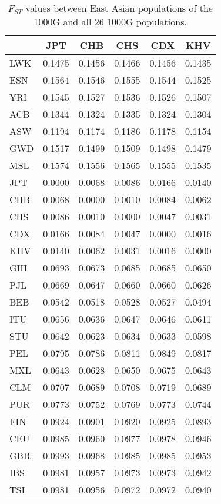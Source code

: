 \begin{table}[ht]
\centering
\caption{$F_{ST}$ values between East Asian populations of the 1000G and all 26 1000G populations.} 
\label{tab:fst-EAS}
\begin{tabular}{|l|c|c|c|c|c|}
  \hline
 & JPT & CHB & CHS & CDX & KHV \\ 
  \hline
LWK & 0.1475 & 0.1456 & 0.1466 & 0.1456 & 0.1435 \\ 
  ESN & 0.1564 & 0.1546 & 0.1555 & 0.1544 & 0.1525 \\ 
  YRI & 0.1545 & 0.1527 & 0.1536 & 0.1526 & 0.1507 \\ 
  ACB & 0.1344 & 0.1324 & 0.1335 & 0.1324 & 0.1304 \\ 
  ASW & 0.1194 & 0.1174 & 0.1186 & 0.1178 & 0.1154 \\ 
  GWD & 0.1517 & 0.1499 & 0.1509 & 0.1498 & 0.1479 \\ 
  MSL & 0.1574 & 0.1556 & 0.1565 & 0.1555 & 0.1535 \\ 
   \hline
JPT & 0.0000 & 0.0068 & 0.0086 & 0.0166 & 0.0140 \\ 
  CHB & 0.0068 & 0.0000 & 0.0010 & 0.0084 & 0.0062 \\ 
  CHS & 0.0086 & 0.0010 & 0.0000 & 0.0047 & 0.0031 \\ 
  CDX & 0.0166 & 0.0084 & 0.0047 & 0.0000 & 0.0016 \\ 
  KHV & 0.0140 & 0.0062 & 0.0031 & 0.0016 & 0.0000 \\ 
   \hline
GIH & 0.0693 & 0.0673 & 0.0685 & 0.0685 & 0.0650 \\ 
  PJL & 0.0669 & 0.0647 & 0.0660 & 0.0660 & 0.0626 \\ 
  BEB & 0.0542 & 0.0518 & 0.0528 & 0.0527 & 0.0494 \\ 
  ITU & 0.0656 & 0.0636 & 0.0647 & 0.0646 & 0.0611 \\ 
  STU & 0.0642 & 0.0623 & 0.0634 & 0.0633 & 0.0598 \\ 
   \hline
PEL & 0.0795 & 0.0786 & 0.0811 & 0.0849 & 0.0817 \\ 
  MXL & 0.0643 & 0.0628 & 0.0650 & 0.0675 & 0.0643 \\ 
  CLM & 0.0707 & 0.0689 & 0.0708 & 0.0719 & 0.0689 \\ 
  PUR & 0.0773 & 0.0752 & 0.0769 & 0.0773 & 0.0744 \\ 
   \hline
FIN & 0.0924 & 0.0901 & 0.0920 & 0.0925 & 0.0893 \\ 
  CEU & 0.0985 & 0.0960 & 0.0977 & 0.0978 & 0.0946 \\ 
  GBR & 0.0993 & 0.0968 & 0.0985 & 0.0985 & 0.0953 \\ 
  IBS & 0.0981 & 0.0957 & 0.0973 & 0.0973 & 0.0942 \\ 
  TSI & 0.0981 & 0.0956 & 0.0972 & 0.0972 & 0.0940 \\ 
   \hline
\end{tabular}
\end{table}
